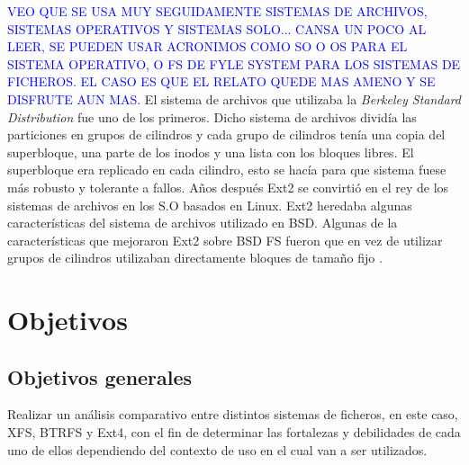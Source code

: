 \textcolor{blue}{VEO QUE SE USA MUY SEGUIDAMENTE SISTEMAS DE ARCHIVOS, SISTEMAS OPERATIVOS Y SISTEMAS SOLO... CANSA UN POCO AL LEER, SE PUEDEN USAR ACRONIMOS COMO SO O OS PARA EL SISTEMA OPERATIVO, O FS DE FYLE SYSTEM PARA LOS SISTEMAS DE FICHEROS. EL CASO ES QUE EL RELATO QUEDE MAS AMENO Y SE DISFRUTE AUN MAS.}
El sistema de archivos que utilizaba la \textit{Berkeley Standard Distribution} fue uno de los primeros. Dicho sistema de archivos dividía las particiones en grupos de cilindros y cada grupo de cilindros tenía una copia del superbloque, una parte de los inodos y una lista con los bloques libres. El superbloque era replicado en cada cilindro, esto se hacía para que sistema fuese más robusto y tolerante a fallos. Años después Ext2 se convirtió en el rey de los sistemas de archivos en los S.O basados en Linux. Ext2 heredaba algunas características del sistema de archivos utilizado en BSD. Algunas de la características que mejoraron Ext2 sobre BSD FS fueron que en vez de utilizar grupos de cilindros utilizaban directamente bloques de tamaño fijo \cite{LinuxKernelDev}.


\section{Objetivos}

\subsection{Objetivos generales}
Realizar un análisis comparativo entre distintos sistemas de ficheros, en este caso, XFS, BTRFS y Ext4, con el fin de determinar las fortalezas y debilidades de cada uno de ellos dependiendo del contexto de uso en el cual van a ser utilizados.


